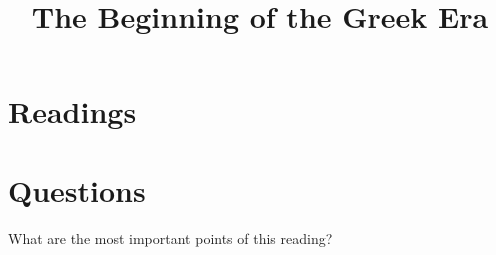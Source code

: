 \documentclass{ximera}
\title{The Beginning of the Greek Era}
\begin{document}
\begin{abstract}
\end{abstract}
\maketitle






\section{Readings}








\section{Questions}




\begin{question}
What are the most important points of this reading?
\begin{freeResponse}
\end{freeResponse}
\end{question}
\end{document}
